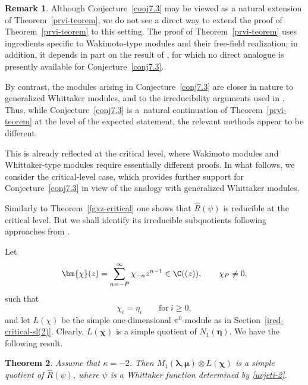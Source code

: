 \documentclass[pdftex]{sigma}
\numberwithin{equation}{section}
\newtheorem{Theorem}{Theorem}[section]
\theoremstyle{definition}
\newtheorem{Remark}[Theorem]{Remark}
\newcommand{\1}{\textbf{1}}
\begin{document}
 \begin{Remark}
Although Conjecture~\ref{conj7.3} may be viewed as a natural extension of Theorem~\ref{prvi-teorem}, we do not see a direct way to extend the proof of Theorem~\ref{prvi-teorem} to this setting. The proof of Theorem~\ref{prvi-teorem} uses ingredients specific to Wakimoto-type modules and their free-field realization; in addition, it depends in part on the result of \cite{FGXZ}, for which no direct analogue is presently available for Conjecture~\ref{conj7.3}.


By contrast, the modules arising in Conjecture~\ref{conj7.3} are closer in nature to generalized Whittaker modules, and to the irreducibility arguments used in \cite{ALZ-16}. Thus, while Conjecture~\ref{conj7.3} is a~natural continuation of Theorem~\ref{prvi-teorem} at the level of the expected statement, the relevant methods appear to be different.


This is already reflected at the critical level, where Wakimoto modules and Whittaker-type modules require essentially different proofs. In what follows, we consider the critical-level case, which provides further support for Conjecture~\ref{conj7.3} in view of the analogy with generalized Whittaker modules. \end{Remark}

 Similarly to Theorem~\ref{fgxz-critical} one shows that $ \widehat{R}(\psi)$ is reducible at the critical level. But we shall identify its irreducible subquotients following approaches from \cite{A-14, ALZ-16}.

 Let
 \[ \bm{\chi}(z) = \sum_{n =-P } ^{\infty} \chi_{-n} z^{n-1} \in {\C}((z)), \qquad \chi_P \ne 0, \]
 such that
 \[ \chi_i = \eta_i \qquad \mbox{for} \ i \ge 0, \]
 and let $L(\chi)$ be the simple one-dimensional $\pi^0$-module as in Section~\ref{ired-critical-sl(2)}. Clearly, $L(\bm{\chi})$ is a simple quotient of $N_1 (\bm{\eta})$.
We have the following result.

\begin{Theorem} Assume that $\kappa =-2$. Then $M_1 (\bm{\lambda}, \bm{\mu}) \otimes L (\bm{\chi})$ is a simple quotient of $\widehat{R}(\psi)$, where $\psi$ is a Whittaker function determined by \eqref{uvjeti-2}.
 \end{Theorem}
\end{document}
